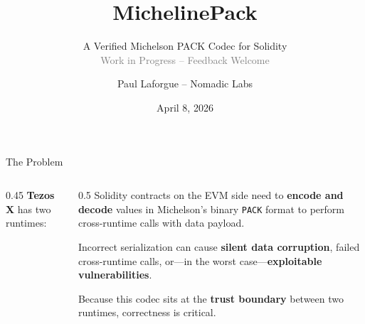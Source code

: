\documentclass[aspectratio=169,10pt]{beamer}
\title{MichelinePack}
\subtitle{A Verified Michelson PACK Codec for Solidity\\[0.3em]\small\textcolor{gray}{Work in Progress -- Feedback Welcome}}
\author{Paul Laforgue -- Nomadic Labs}
\date{April 8, 2026}
\institute{Core Layer 2}
\begin{document}
\begin{frame}
\maketitle
\end{frame}

\begin{frame}{The Problem}

\begin{columns}[T]
\begin{column}{0.45\textwidth}
\textbf{Tezos X} has two runtimes:

\bigskip

\end{column}

\begin{column}{0.5\textwidth}
Solidity contracts on the EVM side need to \textbf{encode and decode} values
in Michelson's binary \texttt{PACK} format to perform cross-runtime calls
with data payload.

\bigskip

Incorrect serialization can cause \textbf{silent data corruption}, failed
cross-runtime calls, or---in the worst case---\textbf{exploitable vulnerabilities}.

\bigskip

Because this codec sits at the \textbf{trust boundary} between two runtimes,
correctness is critical.
\end{column}
\end{columns}
\end{frame}
\end{document}
